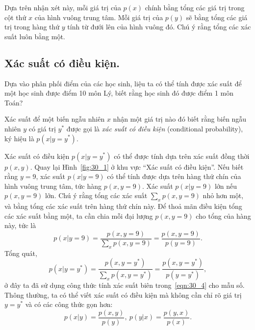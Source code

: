 Dựa trên nhận xét này, mỗi giá trị của $p(x)$ chính bằng tổng các giá trị trong
cột thứ $x$ của hình vuông trung tâm. Mỗi giá trị của $p(y)$ sẽ bằng tổng các
giá trị trong hàng thứ $y$ tính từ đưới lên của hình vuông đó. Chú ý rằng tổng
các xác suất luôn bằng một.


\subsection{Xác suất có điều kiện.}

{Dựa vào phân phối điểm của các học sinh, liệu ta có thể tính được xác suất để
một học sinh được điểm 10 môn Lý, biết rằng học sinh đó được điểm 1 môn Toán?}

Xác suất để một biến ngẫu nhiên $x$ nhận một giá trị nào đó biết
rằng biến ngẫu nhiên $y$ có giá trị $y^*$ được gọi là \textit{xác suất có điều
kiện} (conditional probability), ký hiệu là $p(x| y = y^*)$.


Xác suất có điều kiện $p(x | y = y^*)$ có thể được tính dựa trên xác suất đồng
thời $p(x, y)$. Quay lại Hình~\ref{fig:30_1} ở khu vực ``Xác suất có điều
kiện''. Nếu biết rằng $y = 9$, xác suất $p(x | y = 9)$ có thể tính được dựa trên
hàng thứ chín của hình vuông trung tâm, tức hàng $p(x, y = 9)$. Xác suất $p(x | y =
9) $ lớn nếu $p(x, y= 9)$ lớn. Chú ý rằng tổng các xác suất $\sum_{x} p(x,
y = 9)$ nhỏ hơn một, và bằng tổng các xác suất trên hàng thứ chín này. Để thoả
mãn điều kiện tổng các xác suất bằng một, ta cần chia mỗi đại lượng $p(x, y =
9)$ cho tổng của hàng này, tức là
\begin{equation}
  p(x | y = 9) =\frac{p(x, y = 9)}{\sum \limits_x p(x, y = 9)} =
                \frac{p(x, y = 9)}{p(y = 9)}.
\end{equation}
Tổng quát,
\begin{equation}
\label{eqn:30_9}
\displaystyle
  p(x|y = y^*) = \frac{p(x, y = y^*)}{\sum \limits_{x} p(x, y = y^*)} =
  \frac{p(x, y = y^*)}{p(y = y^*)},
\end{equation}
ở đây ta đã sử dụng công thức tính xác suất biên trong~\eqref{eqn:30_4} cho mẫu
số. Thông thường, ta có thể viết xác suất có điều kiện mà không cần chỉ rõ giá trị $y = y^*$ và có các công thức gọn hơn:
\begin{equation}
  \label{eqn:30_2}
  p(x |y) = \frac{p(x, y)}{p(y)}, ~p(y | x) = \frac{p(y, x)}{p(x)}.
\end{equation}


